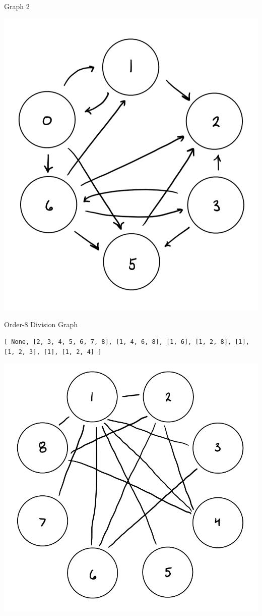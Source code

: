 \documentclass[12pt,twoside]{article}
\begin{document}
\begin{problems}
\begin{problemparts}
    Graph 2
    \begin{center}
        \includegraphics[scale=0.35]{Images/P1Aii.PNG}
    \end{center}

\problempart Order-8 Division Graph

    {\tt [
        None,
        [2, 3, 4, 5, 6, 7, 8],
        [1, 4, 6, 8],
        [1, 6],
        [1, 2, 8],
        [1],
        [1, 2, 3],
        [1],
        [1, 2, 4]
    ]}

    \begin{center}
        \includegraphics[scale=0.35]{Images/P1B.PNG}
    \end{center}


\end{problemparts}
\end{problems}
\end{document}
